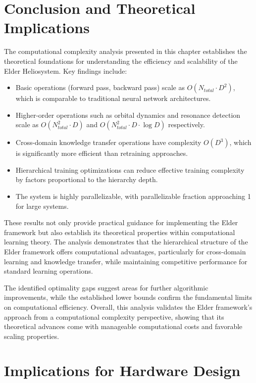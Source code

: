 \section{Conclusion and Theoretical Implications}

The computational complexity analysis presented in this chapter establishes the theoretical foundations for understanding the efficiency and scalability of the Elder Heliosystem. Key findings include:

\begin{itemize}
    \item Basic operations (forward pass, backward pass) scale as $O(N_{total} \cdot D^2)$, which is comparable to traditional neural network architectures.
    \item Higher-order operations such as orbital dynamics and resonance detection scale as $O(N_{total}^2 \cdot D)$ and $O(N_{total}^2 \cdot D \cdot \log D)$ respectively.
    \item Cross-domain knowledge transfer operations have complexity $O(D^3)$, which is significantly more efficient than retraining approaches.
    \item Hierarchical training optimizations can reduce effective training complexity by factors proportional to the hierarchy depth.
    \item The system is highly parallelizable, with parallelizable fraction approaching 1 for large systems.
\end{itemize}

These results not only provide practical guidance for implementing the Elder framework but also establish its theoretical properties within computational learning theory. The analysis demonstrates that the hierarchical structure of the Elder framework offers computational advantages, particularly for cross-domain learning and knowledge transfer, while maintaining competitive performance for standard learning operations.

The identified optimality gaps suggest areas for further algorithmic improvements, while the established lower bounds confirm the fundamental limits on computational efficiency. Overall, this analysis validates the Elder framework's approach from a computational complexity perspective, showing that its theoretical advances come with manageable computational costs and favorable scaling properties.

\section{Implications for Hardware Design}


